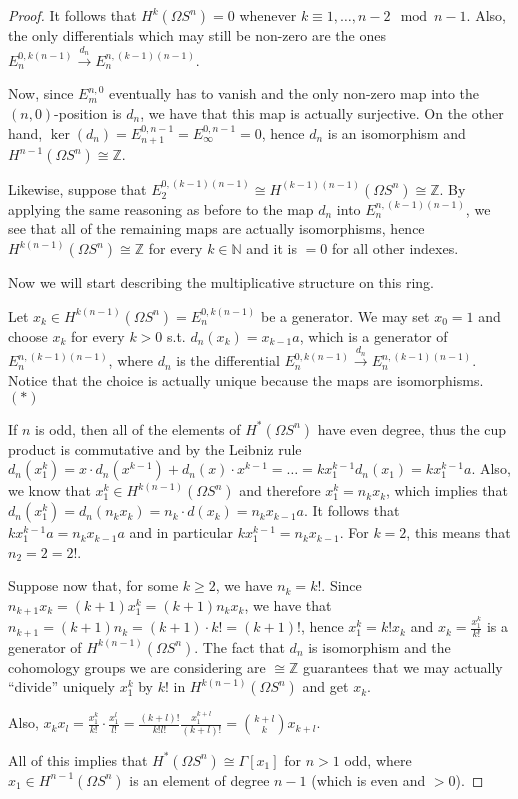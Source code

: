 \documentclass{article}
\newcommand{\numberset}{\mathbb}
\newcommand{\N}{\numberset{N}}
\newcommand{\Z}{\numberset{Z}}
\begin{document}
\begin{proof}
    It follows that $H^k(\Omega S^n)=0$ whenever $k\equiv1,\ldots,n-2\mod n-1$.
    Also, the only differentials which may still be non-zero are the ones
    $E_n^{0,k(n-1)}\xrightarrow{d_n}E_n^{n,(k-1)(n-1)}$.

    Now, since $E^{n,0}_m$ eventually has to vanish and the only non-zero map
    into the $(n,0)$-position is $d_n$, we have that this map is actually
    surjective. On the other hand,
    $\ker(d_n)=E^{0,n-1}_{n+1}=E^{0,n-1}_\infty=0$, hence $d_n$ is an
    isomorphism and $H^{n-1}(\Omega S^n)\cong\Z$.

    Likewise, suppose that $E_2^{0,(k-1)(n-1)}\cong H^{(k-1)(n-1)}(\Omega S^n)
    \cong\Z$. By applying the same reasoning as before to the map $d_n$ into
    $E_n^{n,(k-1)(n-1)}$, we see that all of the remaining maps are actually
    isomorphisms, hence $H^{k(n-1)}(\Omega S^n)\cong\Z$ for every $k\in\N$ and
    it is $=0$ for all other indexes.

    Now we will start describing the multiplicative structure on this ring.

    Let $x_k\in H^{k(n-1)}(\Omega S^n)=E_n^{0,k(n-1)}$ be a generator. We may
    set $x_0=1$ and choose $x_k$ for every $k>0$ s.t. $d_n(x_k)=x_{k-1}a$, which
    is a generator of $E^{n,(k-1)(n-1)}_n$, where $d_n$ is the differential
    $E_n^{0,k(n-1)}\xrightarrow{d_n}E_n^{n,(k-1)(n-1)}$. Notice that the choice
    is actually unique because the maps are isomorphisms. $(*)$
    
    If $n$ is odd, then all of the elements of $H^*(\Omega S^n)$ have even
    degree, thus the cup product is commutative and by the Leibniz rule
    $d_n(x_1^k)=x\cdot d_n(x^{k-1})+d_n(x)\cdot x^{k-1}=
    \ldots=kx_1^{k-1}d_n(x_1)=kx_1^{k-1}a$.
    Also, we know that $x_1^k\in H^{k(n-1)}(\Omega S^n)$ and therefore
    $x_1^k=n_kx_k$, which implies that $d_n(x_1^k)=d_n(n_kx_k)=n_k\cdot
    d(x_k)=n_kx_{k-1}a$. It follows that $kx_1^{k-1}a=n_kx_{k-1}a$ and in
    particular $kx_1^{k-1}=n_kx_{k-1}$. For $k=2$, this means that $n_2=2=2!$.

    Suppose now that, for some $k\geq 2$, we have $n_k=k!$. Since
    $n_{k+1}x_k=(k+1)x_1^k=(k+1)n_kx_k$, we have that
    $n_{k+1}=(k+1)n_k=(k+1)\cdot k!=(k+1)!$, hence $x_1^k=k!x_k$ and
    $x_k=\frac{x_1^k}{k!}$ is a generator of $H^{k(n-1)}(\Omega S^n)$. The fact
    that $d_n$ is isomorphism and the cohomology groups we are considering are
    $\cong\Z$ guarantees that we may actually ``divide'' uniquely $x_1^k$ by
    $k!$ in $H^{k(n-1)}(\Omega S^n)$ and get $x_k$.
    
    Also, $x_kx_l=\frac{x_1^k}{k!}\cdot\frac{x_1^l}{l!}=\frac{(k+l)!}{k!l!}
    \frac{x_1^{k+l}}{(k+l)!}=\binom{k+l}{k}x_{k+l}$.

    All of this implies that $H^*(\Omega S^n)\cong\Gamma[x_1]$ for $n>1$ odd,
    where $x_1\in H^{n-1}(\Omega S^n)$ is an element of degree $n-1$ (which is
    even and $>0$).
\end{proof}
\end{document}
